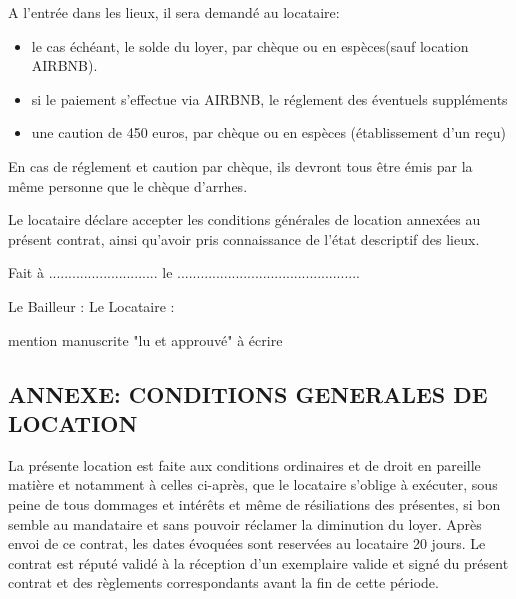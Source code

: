 \documentclass[a4paper,11pt]{article}
\begin{document}
\vspace{0.5cm}

A l'entrée dans les lieux, il sera demandé au locataire:
\begin{itemize}
\item le cas échéant, le solde du loyer, par chèque ou en espèces(sauf location AIRBNB).
\item si le paiement s'effectue via AIRBNB, le réglement des éventuels suppléments
\item une caution de 450 euros, par chèque ou en espèces (établissement d'un reçu)
\end{itemize}
En cas de réglement et caution par chèque, ils devront tous être émis par la même personne que le chèque d'arrhes.

\vspace{0.5cm}

Le locataire déclare accepter les conditions générales de location annexées au présent contrat, ainsi qu'avoir pris connaissance de l'état descriptif des lieux.

\vspace{0.5cm}

Fait à ............................ le ...............................................

\vspace{0.5cm}

Le Bailleur : \hspace{3cm}Le Locataire : 

\hspace{5.2cm}mention manuscrite "lu et approuvé" à écrire


\newpage{}




\begin{center}
\section*  { ANNEXE: CONDITIONS GENERALES  DE LOCATION}
\end{center}


\tiny



La présente location est faite aux conditions ordinaires et de droit en pareille matière et notamment à celles ci-après, que le locataire s’oblige à exécuter, sous peine de tous dommages et intérêts et même de résiliations des présentes, si bon semble au mandataire et sans pouvoir réclamer la diminution du loyer.
Après envoi de ce contrat, les dates évoquées sont reservées au locataire 20 jours. Le contrat est réputé validé à la réception d’un exemplaire valide et signé du présent contrat et des règlements correspondants avant la fin de cette période.
\end{document}
